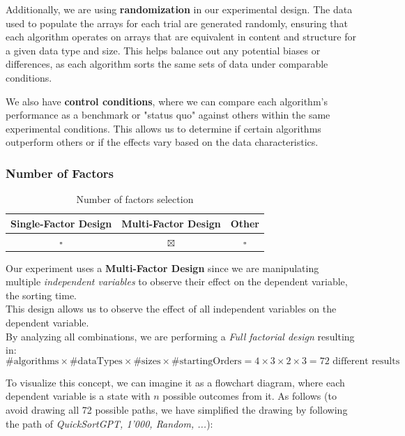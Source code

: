 \documentclass{article}
\begin{document}
        Additionally, we are using \textbf{randomization} in our experimental design. The data used to populate the arrays for each trial are generated randomly, ensuring that each algorithm operates on arrays that are equivalent in content and structure for a given data type and size. This helps balance out any potential biases or differences, as each algorithm sorts the same sets of data under comparable conditions.
        
        We also have \textbf{control conditions}, where we can compare each algorithm's performance as a benchmark or "status quo" against others within the same experimental conditions. This allows us to determine if certain algorithms outperform others or if the effects vary based on the data characteristics.

    \subsubsection{Number of Factors}
        \begin{table}[!h]
            \centering
            \begin{tabular}{c|c|c}
                \textbf{Single-Factor Design} & \textbf{Multi-Factor Design} & \textbf{Other} \\ \hline
                \(\square\) & \(\boxtimes\) & \(\square\) \\
            \end{tabular}
            \caption{Number of factors selection}
        \end{table}

        Our experiment uses a \textbf{Multi-Factor Design} since we are manipulating multiple \textit{independent variables} to observe their effect on the dependent variable, the sorting time. \\ 
        This design allows us to observe the effect of all independent variables on the dependent variable. \\
        By analyzing all combinations, we are performing a \textit{Full factorial design} resulting in: 
        \[
        \#\text{algorithms} \times \#\text{dataTypes} \times \#\text{sizes} \times \#\text{startingOrders} = 4 \times 3 \times 2 \times 3 = 72 \text{ different results}
        \]
        
        To visualize this concept, we can imagine it as a flowchart diagram, where each dependent variable is a state with \( n \) possible outcomes from it. As follows (to avoid drawing all 72 possible paths, we have simplified the drawing by following the path of \textit{QuickSortGPT, 1'000, Random, ...}):
\end{document}
